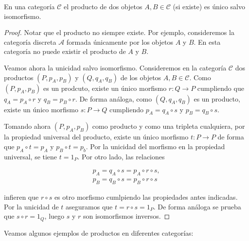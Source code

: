 \begin{proposicion} \label{producto-salvo-iso}
    En una categoría $\mathscr{C}$ el producto de dos objetos $A,B \in \mathscr{C}$ (si existe) es único salvo isomorfismo.
\end{proposicion}
\begin{proof}
    Notar que el producto no siempre existe.  Por ejemplo, consideremos la categoría discreta 
    $\mathscr{A}$ formada únicamente por los objetos $A$ y $B$. En esta categoría no puede existir el producto de $A$ y $B$. 

    Veamos ahora la unicidad salvo isomorfismo. Consideremos en la categoría $\mathscr{C}$ dos productos $(P, p_A, p_B)$ y $(Q, q_A, q_B)$ de los
    objetos $A,B \in \mathscr{C}$. Como $(P, p_A, p_B)$ es un prodcuto, existe un único morfismo $r: Q \longrightarrow P $ cumpliendo que 
    $q_A = p_A \circ r$ y  $q_B = p_B \circ r$. De forma análoga, como $(Q, q_A, q_B)$ es un producto, existe un único morfismo 
    $s: P \longrightarrow Q $ cumpliendo $p_A = q_A \circ s$ y  $p_B = q_B \circ s$.

    Tomando ahora $(P, p_{A}, p_{B})$ como producto y como una tripleta cualquiera, por la propiedad universal del producto, existe un único morfismo
    $t: P \longrightarrow P $ de forma que $p_A \circ t = p_A$ y $p_B \circ t = p_b$. Por la unicidad del morfismo en la propiedad universal, se tiene $t=1_P$.
    Por otro lado, las relaciones

    \begin{align}
        p_A = q_A \circ s = p_A \circ r \circ s,\\
        p_B = q_B \circ s = p_B \circ r \circ s
    \end{align}

    infieren que $r\circ s$ es otro morfismo cumlpiendo las propiedades antes indicadas. Por la unicidad de $t$ aseguramos que $t = r \circ s = 1_P$.
    De forma análoga se prueba que $s \circ r = 1_Q$, luego $s$ y $r$ son isomorfismos inversos.
\end{proof}

Veamos algunos ejemplos de productos en diferentes categorías:

